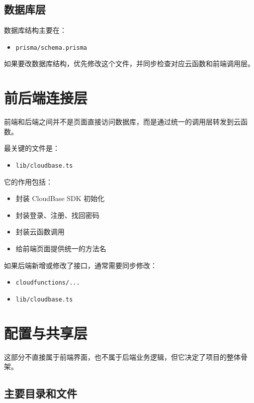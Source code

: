 \documentclass[11pt,a4paper]{ctexart}
\begin{document}
\subsection{数据库层}

数据库结构主要在：

\begin{itemize}
  \item \texttt{prisma/schema.prisma}
\end{itemize}

如果要改数据库结构，优先修改这个文件，并同步检查对应云函数和前端调用层。

\section{前后端连接层}

前端和后端之间并不是页面直接访问数据库，而是通过统一的调用层转发到云函数。

最关键的文件是：

\begin{itemize}
  \item \texttt{lib/cloudbase.ts}
\end{itemize}

它的作用包括：

\begin{itemize}
  \item 封装 CloudBase SDK 初始化
  \item 封装登录、注册、找回密码
  \item 封装云函数调用
  \item 给前端页面提供统一的方法名
\end{itemize}

如果后端新增或修改了接口，通常需要同步修改：

\begin{itemize}
  \item \texttt{cloudfunctions/...}
  \item \texttt{lib/cloudbase.ts}
\end{itemize}

\section{配置与共享层}

这部分不直接属于前端界面，也不属于后端业务逻辑，但它决定了项目的整体骨架。

\subsection{主要目录和文件}
\end{document}
